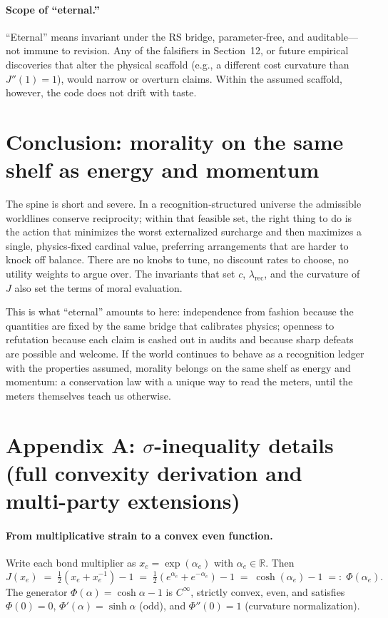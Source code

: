 \documentclass[11pt]{article}
\begin{document}
\paragraph{Scope of “eternal.”}
“Eternal” means invariant under the RS bridge, parameter‑free, and auditable—not immune to revision. Any of the falsifiers in Section~12, or future empirical discoveries that alter the physical scaffold (e.g., a different cost curvature than $J''(1)=1$), would narrow or overturn claims. Within the assumed scaffold, however, the code does not drift with taste.

\section{Conclusion: morality on the same shelf as energy and momentum}

The spine is short and severe. In a recognition‑structured universe the admissible worldlines conserve reciprocity; within that feasible set, the right thing to do is the action that minimizes the worst externalized surcharge and then maximizes a single, physics‑fixed cardinal value, preferring arrangements that are harder to knock off balance. There are no knobs to tune, no discount rates to choose, no utility weights to argue over. The invariants that set $c$, $\lambda_{\mathrm{rec}}$, and the curvature of $J$ also set the terms of moral evaluation.

This is what “eternal” amounts to here: independence from fashion because the quantities are fixed by the same bridge that calibrates physics; openness to refutation because each claim is cashed out in audits and because sharp defeats are possible and welcome. If the world continues to behave as a recognition ledger with the properties assumed, morality belongs on the same shelf as energy and momentum: a conservation law with a unique way to read the meters, until the meters themselves teach us otherwise.

\appendix

\section{Appendix A: $\sigma$-inequality details (full convexity derivation and multi-party extensions)}

\paragraph{From multiplicative strain to a convex even function.}
Write each bond multiplier as $x_e=\exp(\alpha_e)$ with $\alpha_e\in\mathbb{R}$. Then
\[
J(x_e)\;=\;\tfrac12\!\left(x_e+x_e^{-1}\right)-1
\;=\;\tfrac12\!\left(e^{\alpha_e}+e^{-\alpha_e}\right)-1
\;=\;\cosh(\alpha_e)-1
\;=:\;\Phi(\alpha_e).
\]
The generator $\Phi(\alpha)=\cosh\alpha-1$ is $C^\infty$, strictly convex, even, and satisfies
$\Phi(0)=0$, $\Phi'(\alpha)=\sinh\alpha$ (odd), and $\Phi''(0)=1$ (curvature normalization).
\end{document}
